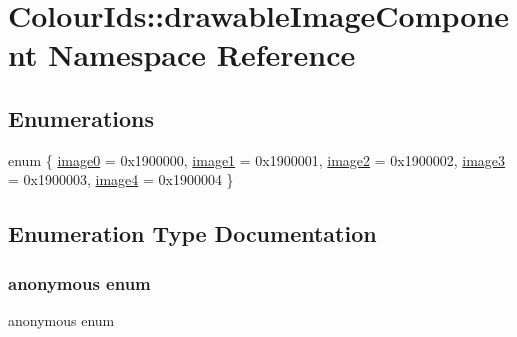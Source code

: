 \hypertarget{namespaceColourIds_1_1drawableImageComponent}{}\section{Colour\+Ids\+:\+:drawable\+Image\+Component Namespace Reference}
\label{namespaceColourIds_1_1drawableImageComponent}
\subsection*{Enumerations}
\begin{DoxyCompactItemize}
\item 
enum \{ \newline
\mbox{\hyperlink{namespaceColourIds_1_1drawableImageComponent_a22fa053f75a7647fadc18cfd6071d8c9a4d717a2375d231d1e42e4cb57ae9a3ba}{image0}} = 0x1900000, 
\mbox{\hyperlink{namespaceColourIds_1_1drawableImageComponent_a22fa053f75a7647fadc18cfd6071d8c9ada3408fc5558c05b5aecc3f7d55295ec}{image1}} = 0x1900001, 
\mbox{\hyperlink{namespaceColourIds_1_1drawableImageComponent_a22fa053f75a7647fadc18cfd6071d8c9a7182fa2b68ce9a473189badc10d2ce41}{image2}} = 0x1900002, 
\mbox{\hyperlink{namespaceColourIds_1_1drawableImageComponent_a22fa053f75a7647fadc18cfd6071d8c9abaf5baf93facf651fc0c4eb415d0e9c8}{image3}} = 0x1900003, 
\newline
\mbox{\hyperlink{namespaceColourIds_1_1drawableImageComponent_a22fa053f75a7647fadc18cfd6071d8c9a604d8634344c213287428a890e6d9f34}{image4}} = 0x1900004
 \}
\end{DoxyCompactItemize}


\subsection{Enumeration Type Documentation}
\mbox{\label{namespaceColourIds_1_1drawableImageComponent_a22fa053f75a7647fadc18cfd6071d8c9}} 
\subsubsection{\texorpdfstring{anonymous enum}{anonymous enum}}
{\footnotesize\ttfamily anonymous enum}

